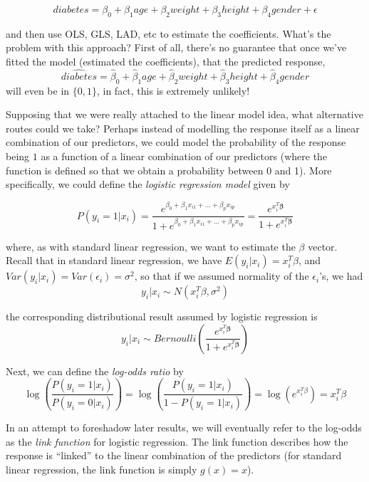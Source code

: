 $$diabetes = \beta_0 + \beta_1 age + \beta_2 weight + \beta_3 height + \beta_4 gender + \epsilon$$

and then use OLS, GLS, LAD, etc to estimate the coefficients. What's the problem with this approach? First of all, there's no guarantee that once we've fitted the model (estimated the coefficients), that the predicted response, 
$$\widehat{diabetes} = \hat{\beta}_0 + \hat{\beta}_1 age + \hat{\beta}_2 weight + \hat{\beta}_3 height + \hat{\beta}_4 gender$$
will even be in $\{0, 1\}$, in fact, this is extremely unlikely!

Supposing that we were really attached to the linear model idea, what alternative routes could we take? Perhaps instead of modelling the response itself as a linear combination of our predictors, we could model the probability of the response being $1$ as a function of a linear combination of our predictors (where the function is defined so that we obtain a probability between 0 and 1). More specifically, we could define the \textit{logistic regression model} given by

$$P(y_i = 1 | x_i) = \frac{e^{\beta_0 + \beta_1x_{i1} + ... + \beta_px_{ip}} }{1 + e^{\beta_0 + \beta_1x_{i1} + ... + \beta_px_{ip}}} = \frac{e^{x_i^T \boldsymbol{\beta}} }{1 + e^{x_i^T \boldsymbol{\beta}}}$$

where, as with standard linear regression, we want to estimate the $\beta$ vector. Recall that in standard linear regression, we have $E(y_i | x_i) = x_i^T\beta$, and $Var(y_i | x_i) = Var(\epsilon_i) = \sigma^2$, so that if we assumed normality of the $\epsilon_i$'s, we had 
$$y_i | x_i \sim N(x_i^T\beta, \sigma^2)$$

the corresponding distributional result assumed by logistic regression is
$$y_i | x_i \sim Bernoulli\left(\frac{e^{x_i^T \boldsymbol{\beta}} }{1 + e^{x_i^T \boldsymbol{\beta}}}\right)$$


Next, we can define the \textit{log-odds ratio} by
$$\log \left(\frac{P(y_i = 1 | x_i)}{P(y_i = 0 | x_i)} \right) = \log  \left(\frac{P(y_i = 1 | x_i)}{1 - P(y_i = 1 | x_i)} \right) = \log \left( e^{x_i^T \beta} \right) = x_i^T \beta$$

In an attempt to foreshadow later results, we will eventually refer to the log-odds as the \textit{link function} for logistic regression. The link function describes how the response is ``linked'' to the linear combination of the predictors (for standard linear regression, the link function is simply $g(x) = x$).



